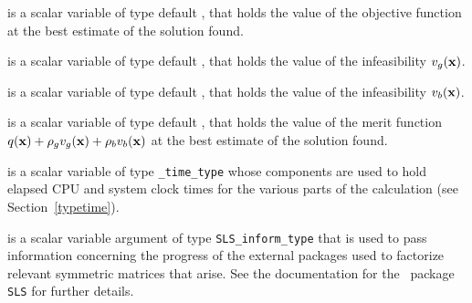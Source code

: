 \begin{description}
 is a scalar variable of type default \realdp, that holds the
value of the objective function at the best estimate of the solution found.

 is a scalar variable of type default \realdp, that holds the
value of the infeasibility $v_g({\mathbf{x}})$.

 is a scalar variable of type default \realdp, that holds the
value of the infeasibility $v_b({\mathbf{x}})$.

 is a scalar variable of type default \realdp, that holds the
value of the merit function $q({\mathbf{x}}) + \rho_g v_g({\mathbf{x}}) + \rho_b v_b({\mathbf{x}})$ 
at the best estimate of the solution found.

 is a scalar variable of type {\tt \packagename\_time\_type} 
whose components are used to hold elapsed CPU  and system clock 
times for the various parts of the calculation (see Section~\ref{typetime}).

 is a scalar variable argument of type 
{\tt SLS\_inform\_type} that is used to pass information
concerning the progress of the external packages used to 
factorize relevant symmetric matrices that arise. 
See the documentation for the \galahad\ package {\tt SLS} for further details. 

\end{description}
